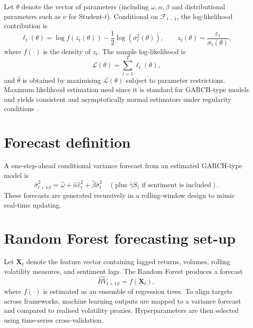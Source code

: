 \documentclass[12pt]{report}
\begin{document}
Let $\theta$ denote the vector of parameters (including $\omega,\alpha,\beta$ and distributional parameters such as $\nu$ for Student-$t$). Conditional on $\mathcal{F}_{t-1}$, the log-likelihood contribution is
\begin{equation}
\ell_t(\theta) = \log f\!\left(z_t(\theta)\right) - \frac{1}{2}\log(\sigma_t^2(\theta)),
\qquad
z_t(\theta)=\frac{\varepsilon_t}{\sigma_t(\theta)},
\end{equation}
where $f(\cdot)$ is the density of $z_t$. The sample log-likelihood is
\begin{equation}
\mathcal{L}(\theta)=\sum_{t=1}^{T}\ell_t(\theta),
\end{equation}
and $\widehat{\theta}$ is obtained by maximising $\mathcal{L}(\theta)$ subject to parameter restrictions.
Maximum likelihood estimation used since it is standard for GARCH-type models and yields consistent and asymptotically normal estimators under regularity conditions \citep{bollerslev1986garch}.

\section{Forecast definition}

A one-step-ahead conditional variance forecast from an estimated GARCH-type model is
\begin{equation}
\widehat{\sigma}_{t+1|t}^2
=
\widehat{\omega} + \widehat{\alpha}\widehat{\varepsilon}_{t}^2 + \widehat{\beta}\widehat{\sigma}_{t}^2
\quad
(\text{plus } \widehat{\gamma} S_t \text{ if sentiment is included}).
\end{equation}
These forecasts are generated recursively in a rolling-window design to mimic real-time updating.

\section{Random Forest forecasting set-up}

Let $\mathbf{X}_t$ denote the feature vector containing lagged returns, volumes, rolling volatility measures, and sentiment lags. The Random Forest produces a forecast
\begin{equation}
\widehat{RV}_{t+1|t} = f(\mathbf{X}_t),
\end{equation}
where $f(\cdot)$ is estimated as an ensemble of regression trees. To align targets across frameworks, machine learning outputs are mapped to a variance forecast and compared to realised volatility proxies. Hyperparameters are then selected using time-series cross-validation.
\end{document}

